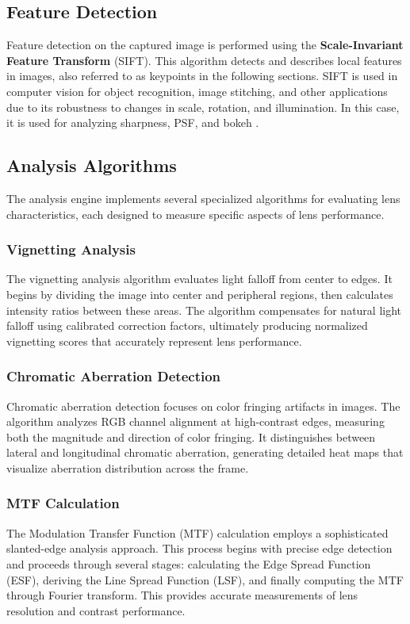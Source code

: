 \subsection{Feature Detection}
Feature detection on the captured image is performed using the \textbf{Scale-Invariant Feature Transform} (SIFT). This algorithm detects and describes local features in images, also referred to as keypoints in the following sections. SIFT is used in computer vision for object recognition, image stitching, and other applications due to its robustness to changes in scale, rotation, and illumination. In this case, it is used for analyzing sharpness, PSF, and bokeh \cite{Sift}.

\subsection{Analysis Algorithms}
The analysis engine implements several specialized algorithms for evaluating lens characteristics, each designed to measure specific aspects of lens performance.

\subsubsection{Vignetting Analysis}
The vignetting analysis algorithm evaluates light falloff from center to edges. It begins by dividing the image into center and peripheral regions, then calculates intensity ratios between these areas. The algorithm compensates for natural light falloff using calibrated correction factors, ultimately producing normalized vignetting scores that accurately represent lens performance.

\subsubsection{Chromatic Aberration Detection}
Chromatic aberration detection focuses on color fringing artifacts in images. The algorithm analyzes RGB channel alignment at high-contrast edges, measuring both the magnitude and direction of color fringing. It distinguishes between lateral and longitudinal chromatic aberration, generating detailed heat maps that visualize aberration distribution across the frame.

\subsubsection{MTF Calculation}
The Modulation Transfer Function (MTF) calculation employs a sophisticated slanted-edge analysis approach. This process begins with precise edge detection and proceeds through several stages: calculating the Edge Spread Function (ESF), deriving the Line Spread Function (LSF), and finally computing the MTF through Fourier transform. This provides accurate measurements of lens resolution and contrast performance.

